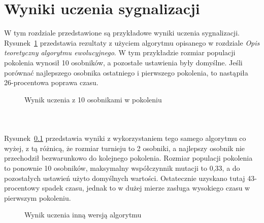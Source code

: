 \chapter*{Wyniki uczenia sygnalizacji}
W tym rozdziale przedstawione są przykładowe wyniki uczenia sygnalizacji.\\
Rysunek~\ref{fig:evoA} przedstawia rezultaty z użyciem algorytmu opisanego w rozdziale \textit{Opis teoretyczny algorytmu ewolucyjnego}. W tym przykładzie rozmiar populacji pokolenia wynosił 10 osobników, a pozostałe ustawienia były domyślne. Jeśli porównać najlepszego osobnika  ostatniego i pierwszego pokolenia, to nastąpiła 26-procentowa poprawa czasu.
\evoA
\begin{figure}[h]
	\centering
	\caption{Wynik uczenia z 10 osobnikami w pokoleniu}
	\label{fig:evoA}
\end{figure}\\
\paragraph{}Rysunek~\ref{fig:evoB} przedstawia wyniki z wykorzystaniem tego samego algorytmu co wyżej, z tą różnicą, że rozmiar turnieju to 2 osobniki, a najlepszy osobnik nie przechodził bezwarunkowo do kolejnego pokolenia. Rozmiar populacji pokolenia to ponownie 10 osobników, maksymalny współczynnik mutacji to 0,33, a do pozostałych ustawień użyto domyślnych wartości. Ostatecznie uzyskano tutaj 43-procentowy spadek czasu, jednak to w dużej mierze zasługa wysokiego czasu w pierwszym pokoleniu.
\evoB
\begin{figure}[h]
	\centering
	\caption{Wynik uczenia inną wersją algorytmu}
	\label{fig:evoB}
\end{figure}
